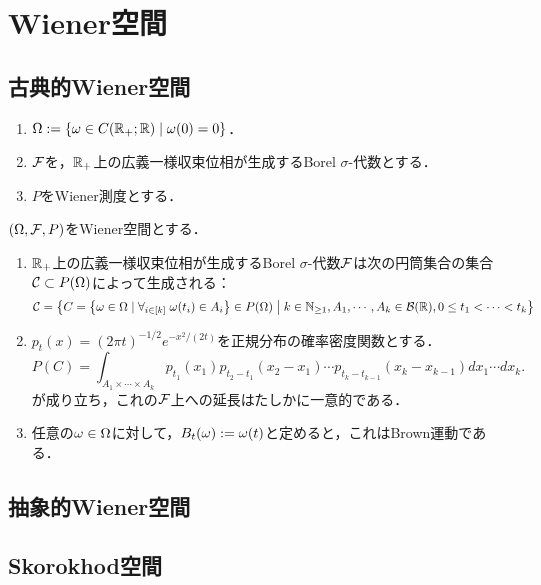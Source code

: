 \documentclass[uplatex,dvipdfmx]{jsreport}
\begin{document}
\section{Wiener空間}

\subsection{古典的Wiener空間}

\begin{definition}
    \begin{enumerate}
        \item $\Omega:=\left\{\omega\in C(\mathbb{R}_+;\mathbb{R})\mid\omega(0)=0\right\}$．
        \item $\mathcal{F}$を，$\mathbb{R}_+$上の広義一様収束位相が生成するBorel $\sigma$-代数とする．
        \item $P$をWiener測度とする．
    \end{enumerate}
\end{definition}

\begin{proposition}
    $(\Omega,\mathcal{F},P)$をWiener空間とする．
    \begin{enumerate}
        \item $\mathbb{R}_+$上の広義一様収束位相が生成するBorel $\sigma$-代数$\mathcal{F}$は次の円筒集合の集合$\mathcal{C}\subset P(\Omega)$によって生成される：
        \[\mathcal{C}=\left\{C=\left\{\omega\in\Omega\mid\forall_{i\in[k]}\;\omega(t_i)\in A_i\right\}\in P(\Omega)\;\middle|\;k\in\mathbb{N}_{\ge1},A_1,\cdots,A_k\in\mathcal{B}(\mathbb{R}),0\le t_1<\cdots<t_k\right\}\]
        \item $p_t(x)=(2\pi t)^{-1/2}e^{-x^2/(2t)}$を正規分布の確率密度関数とする．
        \[P(C)=\int_{A_1\times\cdots\times A_k}p_{t_1}(x_1)p_{t_2-t_1}(x_2-x_1)\cdots p_{t_k-t_{k-1}}(x_k-x_{k-1})dx_1\cdots dx_k.\]
        が成り立ち，これの$\mathcal{F}$上への延長はたしかに一意的である．
        \item 任意の$\omega\in\Omega$に対して，$B_t(\omega):=\omega(t)$と定めると，これはBrown運動である．
    \end{enumerate}
\end{proposition}

\subsection{抽象的Wiener空間}

\subsection{Skorokhod空間}
\end{document}
